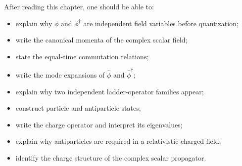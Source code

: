 After reading this chapter, one should be able to:
\begin{itemize}
    \item explain why \(\phi\) and \(\phi^\dagger\) are independent field
    variables before quantization;
    \item write the canonical momenta of the complex scalar field;
    \item state the equal-time commutation relations;
    \item write the mode expansions of \(\hat\phi\) and \(\hat\phi^\dagger\);
    \item explain why two independent ladder-operator families appear;
    \item construct particle and antiparticle states;
    \item write the charge operator and interpret its eigenvalues;
    \item explain why antiparticles are required in a relativistic charged field;
    \item identify the charge structure of the complex scalar propagator.
\end{itemize}

